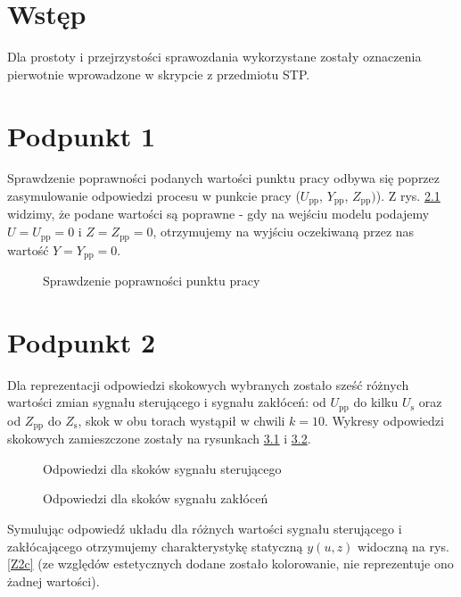 \chapter{Wstęp}
Dla prostoty i przejrzystości sprawozdania wykorzystane zostały oznaczenia pierwotnie wprowadzone w skrypcie z przedmiotu STP.

\chapter{Podpunkt 1}
Sprawdzenie poprawności podanych wartości punktu pracy odbywa się poprzez zasymulowanie odpowiedzi procesu w punkcie pracy ($U_{\mathrm{pp}}$, $Y_{\mathrm{pp}}$, $Z_{\mathrm{pp}})$). Z rys. \ref{Z1} widzimy, że podane wartości są poprawne - gdy na wejściu modelu podajemy $U=U_{\mathrm{pp}}=0$ i $Z=Z_{\mathrm{pp}}=\num{0}$, otrzymujemy na wyjściu oczekiwaną przez nas wartość $Y=Y_{\mathrm{pp}}=\num{0}$.

\begin{figure}[ht]
\centering

\caption{Sprawdzenie poprawności punktu pracy}
\label{Z1}
\end{figure}


\chapter{Podpunkt 2}
Dla reprezentacji odpowiedzi skokowych wybranych zostało sześć różnych wartości zmian sygnału sterującego i sygnału zakłóceń: od $U_{\mathrm{pp}}$ do kilku $U_{\mathrm{s}}$ oraz od $Z_{\mathrm{pp}}$ do  $Z_{\mathrm{s}}$, skok w obu torach wystąpił w chwili $k=10$. Wykresy odpowiedzi skokowych zamieszczone zostały na rysunkach \ref{Z2a} i \ref{Z2b}.

\begin{figure}[ht]
\centering

\caption{Odpowiedzi dla skoków sygnału sterującego} 
\label{Z2a}
\end{figure}

\begin{figure}[ht]
\centering

\caption{Odpowiedzi dla skoków sygnału zakłóceń}
\label{Z2b}
\end{figure}

Symulując odpowiedź układu dla różnych wartości sygnału sterującego i zakłócającego otrzymujemy charakterystykę statyczną $y(u,z)$ widoczną na rys. \ref{Z2c} (ze względów estetycznych dodane zostało kolorowanie, nie reprezentuje ono żadnej wartości).

